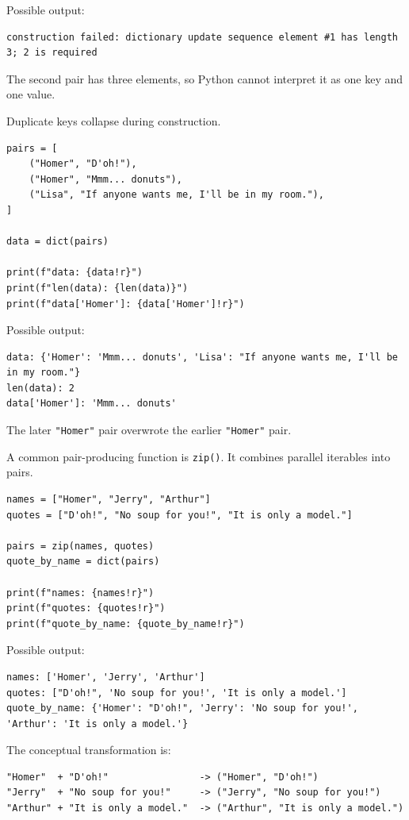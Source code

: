 Possible output:

\begin{verbatim}
construction failed: dictionary update sequence element #1 has length 3; 2 is required
\end{verbatim}

The second pair has three elements, so Python cannot interpret it as one key and one value.

Duplicate keys collapse during construction.

\begin{verbatim}
pairs = [
    ("Homer", "D'oh!"),
    ("Homer", "Mmm... donuts"),
    ("Lisa", "If anyone wants me, I'll be in my room."),
]

data = dict(pairs)

print(f"data: {data!r}")
print(f"len(data): {len(data)}")
print(f"data['Homer']: {data['Homer']!r}")
\end{verbatim}

Possible output:

\begin{verbatim}
data: {'Homer': 'Mmm... donuts', 'Lisa': "If anyone wants me, I'll be in my room."}
len(data): 2
data['Homer']: 'Mmm... donuts'
\end{verbatim}

The later \texttt{"Homer"} pair overwrote the earlier \texttt{"Homer"} pair.

A common pair-producing function is \texttt{zip()}. It combines parallel iterables into pairs.

\begin{verbatim}
names = ["Homer", "Jerry", "Arthur"]
quotes = ["D'oh!", "No soup for you!", "It is only a model."]

pairs = zip(names, quotes)
quote_by_name = dict(pairs)

print(f"names: {names!r}")
print(f"quotes: {quotes!r}")
print(f"quote_by_name: {quote_by_name!r}")
\end{verbatim}

Possible output:

\begin{verbatim}
names: ['Homer', 'Jerry', 'Arthur']
quotes: ["D'oh!", 'No soup for you!', 'It is only a model.']
quote_by_name: {'Homer': "D'oh!", 'Jerry': 'No soup for you!', 'Arthur': 'It is only a model.'}
\end{verbatim}

The conceptual transformation is:

\begin{verbatim}
"Homer"  + "D'oh!"                -> ("Homer", "D'oh!")
"Jerry"  + "No soup for you!"     -> ("Jerry", "No soup for you!")
"Arthur" + "It is only a model."  -> ("Arthur", "It is only a model.")
\end{verbatim}

